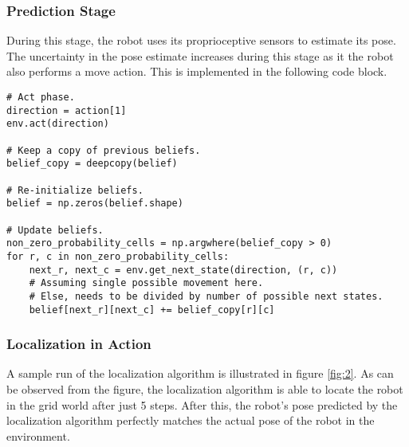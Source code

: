 \documentclass[a4paper,10pt]{article} %
\begin{document}
\subsubsection*{Prediction Stage}

During this stage, the robot uses its proprioceptive sensors to estimate its pose.
The uncertainty in the pose estimate increases during this stage as it the robot also performs a move action.
This is implemented in the following code block.

\begin{verbatim}
# Act phase.
direction = action[1]
env.act(direction)

# Keep a copy of previous beliefs.
belief_copy = deepcopy(belief)

# Re-initialize beliefs.
belief = np.zeros(belief.shape)

# Update beliefs.
non_zero_probability_cells = np.argwhere(belief_copy > 0)
for r, c in non_zero_probability_cells:
    next_r, next_c = env.get_next_state(direction, (r, c))
    # Assuming single possible movement here.
    # Else, needs to be divided by number of possible next states.
    belief[next_r][next_c] += belief_copy[r][c]
\end{verbatim}

\subsubsection*{Localization in Action}

A sample run of the localization algorithm is illustrated in figure \ref{fig:2}.
As can be observed from the figure, the localization algorithm is able to locate the robot in the grid world after just 5 steps.
After this, the robot's pose predicted by the localization algorithm perfectly matches the actual pose of the robot in the environment.
\end{document}
